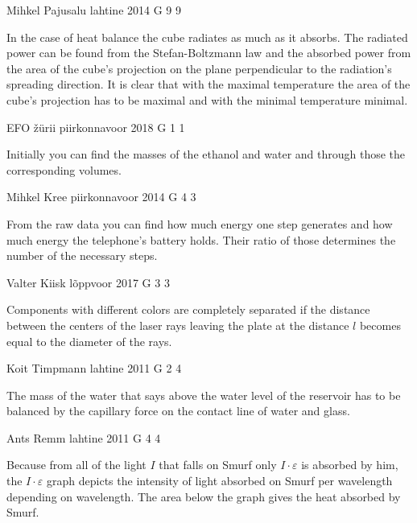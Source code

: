 \documentclass[11pt]{article}
\begin{document}
{Mihkel Pajusalu} %
{lahtine} %
{2014} %
{G 9} %
{9} %
{

\ifEngHint
In the case of heat balance the cube radiates as much as it absorbs. The radiated power can be found from the Stefan-Boltzmann law and the absorbed power from the area of the cube’s projection on the plane perpendicular to the radiation’s spreading direction. It is clear that with the maximal temperature the area of the cube’s projection has to be maximal and with the minimal temperature minimal.
\fi
}

{EFO žürii} %
{piirkonnavoor} %
{2018} %
{G 1} %
{1} %
{

\ifEngHint
Initially you can find the masses of the ethanol and water and through those the corresponding volumes.
\fi
}

{Mihkel Kree} %
{piirkonnavoor} %
{2014} %
{G 4} %
{3} %
{

\ifEngHint
From the raw data you can find how much energy one step generates and how much energy the telephone’s battery holds. Their ratio of those determines the number of the necessary steps.
\fi
}

{Valter Kiisk} %
{lõppvoor} %
{2017} %
{G 3} %
{3} %
{

\ifEngHint
Components with different colors are completely separated if the distance between the centers of the laser rays leaving the plate at the distance $l$ becomes equal to the diameter of the rays.
\fi
}

{Koit Timpmann} %
{lahtine} %
{2011} %
{G 2} %
{4} %
{

\ifEngHint
The mass of the water that says above the water level of the reservoir has to be balanced by the capillary force on the contact line of water and glass.
\fi
}

{Ants Remm} %
{lahtine} %
{2011} %
{G 4} %
{4} %
{

\ifEngHint
Because from all of the light $I$ that falls on Smurf only $ I \cdot\varepsilon $ is absorbed by him, the $ I \cdot \varepsilon $ graph depicts the intensity of light absorbed on Smurf per wavelength depending on wavelength. The area below the graph gives the heat absorbed by Smurf.
\fi
}
\end{document}
